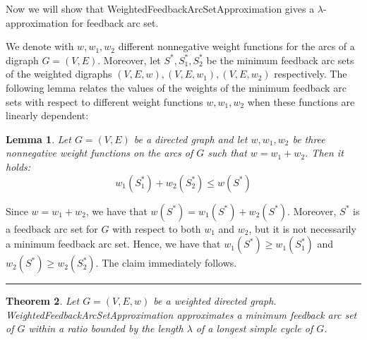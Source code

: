 \documentclass{article}
\newtheorem{theorem}{Theorem}
\newtheorem{lemma}[theorem]{Lemma}
\newenvironment{proof}{{\bf Proof:}}{\hfill\rule{2mm}{2mm}}
\begin{document}
Now we will show that {\sc WeightedFeedbackArcSetApproximation} gives a $\lambda$-approximation for feedback arc set.

We denote with $w, w_1, w_2$ different nonnegative weight functions for the arcs of a digraph $G = (V, E)$. Moreover, let $S^*, S_1^*, S_2^*$ be the minimum
feedback arc sets of the weighted digraphs $(V, E, w), (V, E, w_1), (V, E, w_2)$ respectively. The following lemma relates the values of the weights of the minimum feedback arc sets with respect to different weight functions $w, w_1, w_2$ when these functions are linearly dependent:

\begin{lemma}
    Let $G = (V, E)$ be a directed graph and let $w, w_1, w_2$ be three nonnegative weight functions on the arcs of $G$ such that $w = w_1 + w_2$. Then it holds: $$w_1(S_1^*) + w_2(S_2^*) \leq w(S^*)$$
\end{lemma}

\begin{proof}
    Since $w = w_1 + w_2$, we have that $w(S^*) = w_1(S^*) + w_2(S^*)$. Moreover, $S^*$ is a feedback arc set for $G$ with respect to both $w_1$ and $w_2$, but it is not necessarily a minimum feedback arc set. Hence, we have that $w_1(S^*) \geq w_1(S_1^*)$ and $w_2(S^*) \geq w_2(S_2^*)$. The claim immediately follows.
\end{proof}

\begin{theorem}
    Let $G = (V, E, w)$ be a weighted directed graph. {\sc WeightedFeedbackArcSetApproximation} approximates a minimum feedback arc set of $G$ within a ratio bounded by the length $\lambda$ of a longest simple cycle of $G$.
\end{theorem}
\end{document}
